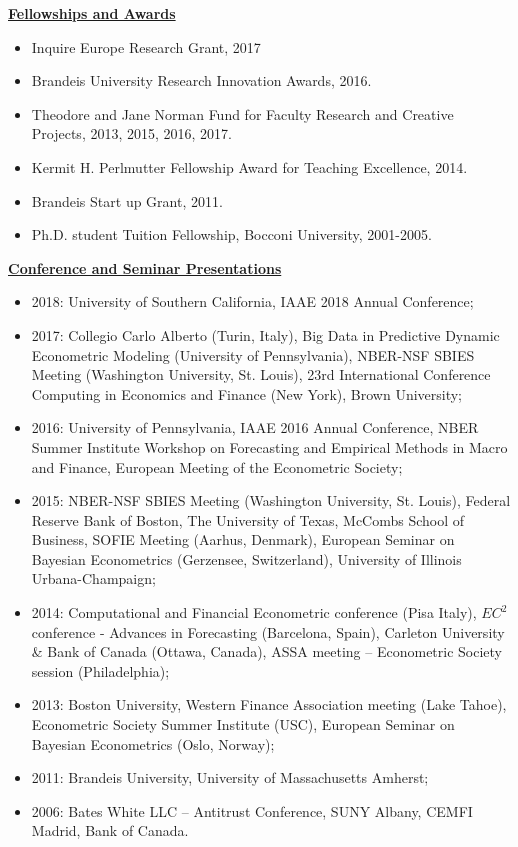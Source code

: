 \documentclass[12pt]{article}
\begin{document}
\underline{\textbf{Fellowships and Awards}}
\begin{itemize}
\item Inquire Europe Research Grant, 2017	
\item Brandeis University Research Innovation Awards, 2016. 
\item Theodore and Jane Norman Fund for Faculty Research and Creative Projects, 2013, 2015, 2016, 2017. 
\item Kermit H. Perlmutter Fellowship Award for Teaching Excellence, 2014. 
\item Brandeis Start up Grant, 2011. 
\item Ph.D. student Tuition Fellowship, Bocconi University, 2001-2005.
\end{itemize}
\underline{\textbf{Conference and Seminar Presentations}}
\begin{itemize}
	\item 2018: University of Southern California, IAAE 2018 Annual Conference;
	\item 2017: Collegio Carlo Alberto (Turin, Italy), Big Data in Predictive Dynamic Econometric Modeling (University of Pennsylvania), NBER-NSF SBIES Meeting (Washington University, St. Louis), 23rd International Conference Computing in Economics and Finance (New York), Brown University;
	\item 2016: University of Pennsylvania, IAAE 2016 Annual Conference, NBER Summer Institute Workshop on Forecasting and Empirical Methods in Macro and Finance, European Meeting of the Econometric Society;
  \item 2015: NBER-NSF SBIES Meeting (Washington University, St. Louis), Federal Reserve Bank of Boston, The University of Texas, McCombs School of Business, SOFIE Meeting (Aarhus, Denmark), European Seminar on Bayesian Econometrics (Gerzensee, Switzerland), University of Illinois Urbana-Champaign;
	\item 2014: Computational and Financial Econometric conference (Pisa Italy), $EC^2$ conference - Advances in Forecasting (Barcelona, Spain),  Carleton University \& Bank of Canada (Ottawa, Canada), ASSA meeting -- Econometric Society session (Philadelphia);  
	\item 2013: Boston University, Western Finance Association meeting (Lake Tahoe), Econometric Society Summer Institute (USC), European Seminar on Bayesian Econometrics (Oslo, Norway); 
	\item 2011: Brandeis University, University of Massachusetts Amherst; 
	\item 2006: Bates White LLC -- Antitrust Conference, SUNY Albany, CEMFI Madrid, Bank of Canada.
\end{itemize}
\end{document}
